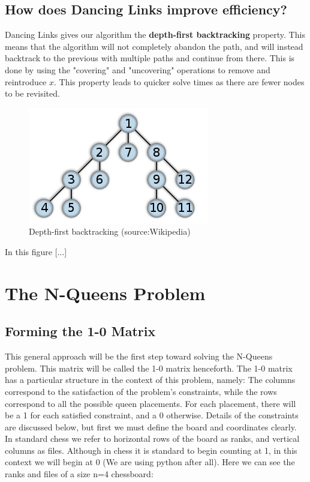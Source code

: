 \documentclass{article}
\begin{document}
\subsection{How does Dancing Links improve efficiency?}
Dancing Links gives our algorithm the \textbf{depth-first backtracking} property. This means that the algorithm will not completely abandon the path, and will instead backtrack to the previous with multiple paths and continue from there. This is done by using the "covering" and "uncovering" operations to remove and reintroduce $x$. This property leads to quicker solve times as there are fewer nodes to be revisited.
\begin{figure}[ht]
\includegraphics[scale=1]{images/depth-first.png}
\caption{Depth-first backtracking (source:Wikipedia)}
\label{fig: Depth-first backtracking (source:Wikipedia)}
\end{figure}
In this figure [...]
\clearpage
\section{The N-Queens Problem}
\subsection{Forming the 1-0 Matrix}
This general approach will be the first step toward solving the N-Queens problem. This matrix will be called the 1-0 matrix henceforth. The 1-0 matrix has a particular structure in the context of this problem, namely: The columns correspond to the satisfaction of the problem’s constraints, while the rows correspond to all the possible queen placements. For each placement, there will be a 1 for each satisfied constraint, and a 0 otherwise. Details of the constraints are discussed below, but first we must define the board and coordinates clearly.
In standard chess we refer to horizontal rows of the board as ranks, and vertical columns as files. Although in chess it is standard to begin counting at 1, in this context we will begin at 0 (We are using python after all).
Here we can see the ranks and files of a size n=4 chessboard:
\end{document}

